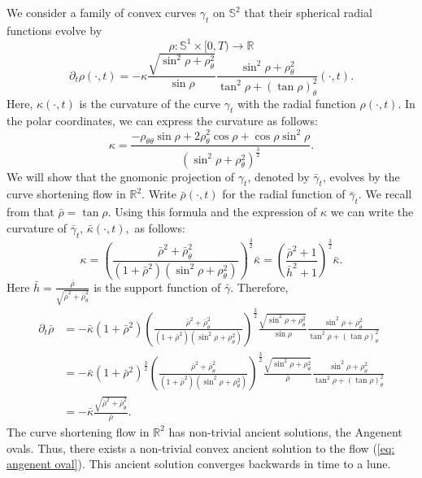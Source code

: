 \documentclass{amsart}
\begin{document}
\begin{example}
We consider a family of convex curves $\gamma_t$ on $\mathbb{S}^2$ that their spherical radial functions evolve by
\[\rho:\mathbb{S}^1\times[0,T)\to \mathbb{R}\]
\begin{equation}\label{eq: angenent oval}
\partial_t\rho(\cdot,t)=-\kappa \frac{\sqrt{\sin^2\rho+\rho_{\theta}^2}}{\sin\rho}\frac{\sin^2\rho+\rho_{\theta}^2}{\tan^2\rho+(\tan\rho)_{\theta}^2}(\cdot,t).
\end{equation}
Here, $\kappa(\cdot,t)$ is the curvature of the curve $\gamma_t$ with the radial function $\rho(\cdot,t).$ 
In the polar coordinates, we can express the curvature as follows:
\[\kappa=\frac{-\rho_{\theta\theta}\sin\rho+2\rho_\theta^2\cos\rho+\cos\rho\sin^2\rho}{(\sin^2\rho+\rho_{\theta}^2)^{\frac{3}{2}}}.\]
We will show that the gnomonic projection of $\gamma_t$, denoted by $\bar{\gamma}_t$, evolves by the curve shortening flow in $\mathbb{R}^2.$ Write $\bar{\rho}(\cdot,t)$ for the radial function of $\bar{\gamma}_t$. We recall from \cite[page 8]{besau2014spherical} that
$\bar{\rho}=\tan\rho.$ Using this formula and the expression of $\kappa$ we can write the curvature of $\bar{\gamma}_t$,  $\bar{\kappa}(\cdot,t),$ as follows:
\[\kappa=\left(\frac{\bar{\rho}^2+\bar{\rho}_{\theta}^2}{(1+\bar{\rho}^2)(\sin^2\rho+\rho_{\theta}^2)}\right)^{\frac{3}{2}}\bar{\kappa}=\left(\frac{\bar{\rho}^2+1}{\bar{h}^2+1}\right)^{\frac{3}{2}}\bar{\kappa}.\]
Here $\bar{h}=\frac{\bar{\rho}}{\sqrt{\bar{\rho}^2+\bar{\rho}_{\theta}^2}}$ is the support function of $\bar{\gamma}.$
Therefore, 
\begin{align*}
\partial_t\bar{\rho}&=-\bar{\kappa}(1+\bar{\rho}^2)\left(\frac{\bar{\rho}^2+\bar{\rho}_{\theta}^2}{(1+\bar{\rho}^2)(\sin^2\rho+\rho_{\theta}^2)}\right)^{\frac{3}{2}}\frac{\sqrt{\sin^2\rho+\rho_{\theta}^2}}{\sin\rho}\frac{\sin^2\rho+\rho_{\theta}^2}{\tan^2\rho+(\tan\rho)_{\theta}^2}\\
&=-\bar{\kappa}(1+\bar{\rho}^2)^{\frac{3}{2}}\left(\frac{\bar{\rho}^2+\bar{\rho}_{\theta}^2}{(1+\bar{\rho}^2)(\sin^2\rho+\rho_{\theta}^2)}\right)^{\frac{3}{2}}\frac{\sqrt{\sin^2\rho+\rho_{\theta}^2}}{\bar{\rho}}\frac{\sin^2\rho+\rho_{\theta}^2}{\tan^2\rho+(\tan\rho)_{\theta}^2}\\
&=-\bar{\kappa}\frac{\sqrt{\bar{\rho}^2+\bar{\rho}_{\theta}^2}}{\bar{\rho}}.
\end{align*}
The curve shortening flow in $\mathbb{R}^2$ has non-trivial ancient solutions, the Angenent ovals. Thus, there exists a non-trivial convex ancient solution to the flow (\ref{eq: angenent oval}). This ancient solution converges backwards in time to a lune. 
\end{example}
\end{document}
